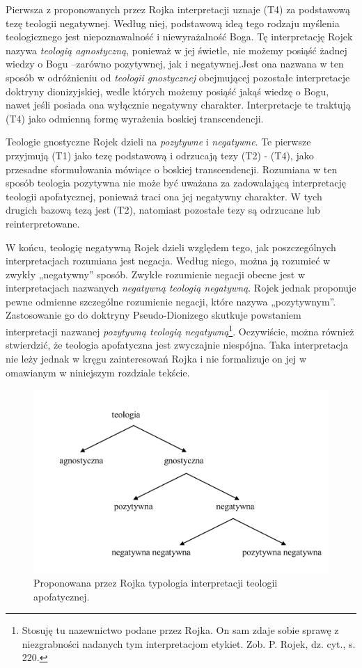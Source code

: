 Pierwsza z proponowanych przez Rojka interpretacji uznaje (T4) za
podstawową tezę teologii negatywnej. Według niej, podstawową ideą tego
rodzaju myślenia teologicznego jest niepoznawalność i niewyrażalność
Boga. Tę interpretację Rojek nazywa \textit{teologią agnostyczną},
ponieważ w jej świetle, nie możemy posiąść żadnej wiedzy o Bogu
–zarówno pozytywnej, jak i negatywnej.Jest ona nazwana w ten sposób w
odróżnieniu od \textit{teologii gnostycznej} obejmującej pozostałe
interpretacje doktryny dionizyjskiej, wedle których możemy posiąść
jakąś wiedzę o Bogu, nawet jeśli posiada ona wyłącznie negatywny
charakter. Interpretacje te traktują (T4) jako odmienną formę wyrażenia
boskiej transcendencji.

Teologie gnostyczne Rojek dzieli na \textit{pozytywne} i
\textit{negatywne}. Te pierwsze przyjmują (T1) jako tezę podstawową i
odrzucają tezy (T2) - (T4), jako przesadne sformułowania mówiące o
boskiej transcendencji. Rozumiana w ten sposób teologia pozytywna nie
może być uważana za zadowalającą interpretację teologii apofatycznej,
ponieważ traci ona jej negatywny charakter. W tych drugich bazową tezą
jest (T2), natomiast pozostałe tezy są odrzucane lub reinterpretowane.

W końcu, teologię negatywną Rojek dzieli względem tego, jak
poszczególnych interpretacjach rozumiana jest negacja. Według niego,
można ją rozumieć w zwykły „negatywny” sposób. Zwykłe rozumienie
negacji obecne jest w interpretacjach nazwanych \textit{negatywną
teologią negatywną}. Rojek jednak proponuje pewne odmienne szczególne
rozumienie negacji, które nazywa „pozytywnym”. Zastosowanie go do
doktryny Pseudo-Dionizego skutkuje powstaniem interpretacji nazwanej
\textit{pozytywną teologią negatywną}\footnote{Stosuję tu nazewnictwo
podane przez Rojka. On sam zdaje sobie sprawę z niezgrabności nadanych
tym interpretacjom etykiet. Zob. P. Rojek, dz. cyt., s. 220. }.
Oczywiście, można również stwierdzić, że teologia apofatyczna jest
zwyczajnie niespójna. Taka interpretacja nie leży jednak w kręgu
zainteresowań Rojka i nie formalizuje on jej w omawianym w niniejszym
rozdziale tekście.


\begin{figure}[h]
{\centering
\includegraphics[width=1\linewidth]{typologia.jpg}
\caption{Proponowana przez Rojka
typologia interpretacji teologii apofatycznej.}
}
\end{figure}

